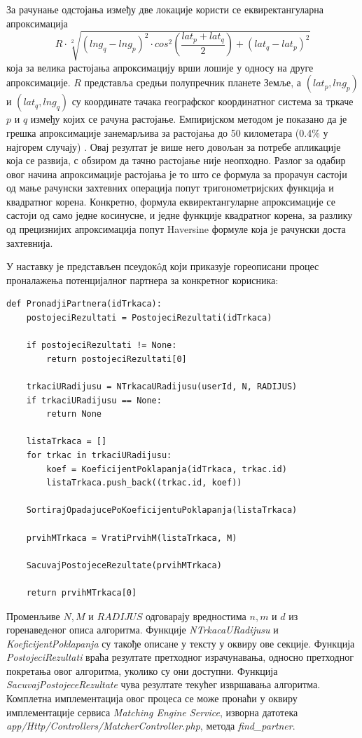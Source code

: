 \documentclass[12pt,oneside]{memoir}
\begin{document}
За рачунање одстојања између две локације користи се еквиректангуларна апроксимација \cite{distance_approximation} \[R \cdot \sqrt[2]{(lng_q - lng_p)^2 \cdot cos^2(\frac{lat_p + lat_q}{2}) + (lat_q - lat_p)^2}\] која за велика растојања апроксимацију врши лошије у односу на друге апроксимације. $R$ представља средњи полупречник планете Земље, а $(lat_p, lng_p)$ и $(lat_q, lng_q)$ су координате тачака географског координатног система за тркаче $p$ и $q$ између којих се рачуна растојање. Емпиријском методом је показано да је грешка апроксимације занемарљива за растојања до 50 километара (0.4\% у најгорем случају) \cite{geographic_distance_article}. Овај резултат је више него довољан за потребе апликације која се развија, с обзиром да тачно растојање није неопходно. Разлог за одабир овог начина апроксимације растојања је то што се формула за прорачун састоји од мање рачунски захтевних операција попут тригонометријских функција и квадратног корена. Конкретно, формула еквиректангуларне апроксимације се састоји од само једне косинусне, и једне функције квадратног корена, за разлику од прецизнијих апроксимација попут Haversine формуле \cite{distance_approximation} која је рачунски доста захтевнија.

У наставку је представљен псеудокôд који приказује гореописани процес проналажења потенцијалног партнера за конкретног корисника:
\begin{english}
\begin{lstlisting}
def PronadjiPartnera(idTrkaca):
    postojeciRezultati = PostojeciRezultati(idTrkaca)

    if postojeciRezultati != None:
        return postojeciRezultati[0]

    trkaciURadijusu = NTrkacaURadijusu(userId, N, RADIJUS)
    if trkaciURadijusu == None:
        return None

    listaTrkaca = []
    for trkac in trkaciURadijusu:
        koef = KoeficijentPoklapanja(idTrkaca, trkac.id)
        listaTrkaca.push_back((trkac.id, koef))

    SortirajOpadajucePoKoeficijentuPoklapanja(listaTrkaca)

    prvihMTrkaca = VratiPrvihM(listaTrkaca, M)
    
    SacuvajPostojeceRezultate(prvihMTrkaca)

    return prvihMTrkaca[0]
\end{lstlisting}
\end{english}
Променљиве $N, M$ и $RADIJUS$ одговарају вредностима $n, m$ и $d$ из горенаведeног описа алгоритма. Функције \textit{NTrkacaURadijusu} и \textit{KoeficijentPoklapanja} су такође описане у тексту у оквиру ове секције. Функција \textit{PostojeciRezultati} враћа резултате претходног израчунавања, односно претходног покретања овог алгоритма, уколико су они доступни. Функција \textit{SacuvajPostojeceRezultate} чува резултате текућег извршавања алгоритма. Комплетна имплементација овог процеса се може пронаћи у оквиру имплементације сервиса \textit{Matching Engine Service}, изворна датотека \textit{app/Http/Controllers/MatcherController.php}, метода \textit{find\_partner}.
\end{document}
